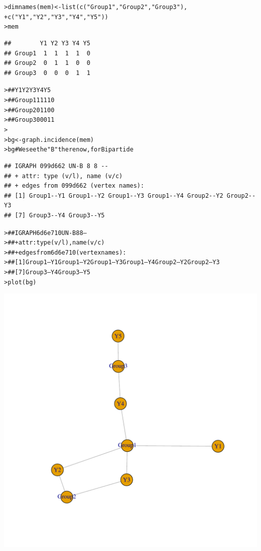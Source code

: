 \documentclass[12pt]{article}\usepackage[]{graphicx}\usepackage[]{color}
\makeatletter
\newcommand{\hlstr}[1]{\textcolor[rgb]{0.82,0.78,0.62}{#1}}%
\newcommand{\hlcom}[1]{\textcolor[rgb]{0.404,0.408,0.42}{#1}}%
\newcommand{\hlstd}[1]{\textcolor[rgb]{0.882,0.878,0.898}{#1}}%
\newcommand{\hlkwb}[1]{\textcolor[rgb]{0.902,0.675,0.196}{#1}}%
\newcommand{\hlkwd}[1]{\textcolor[rgb]{0.733,0.388,0.812}{#1}}%
\newenvironment{kframe}{%
 \def\at@end@of@kframe{}%
 \ifinner\ifhmode%
  \def\at@end@of@kframe{\end{minipage}}%
  \begin{minipage}{\columnwidth}%
 \fi\fi%
 \def\FrameCommand##1{\hskip\@totalleftmargin \hskip-\fboxsep
 \colorbox{shadecolor}{##1}\hskip-\fboxsep
     \hskip-\linewidth \hskip-\@totalleftmargin \hskip\columnwidth}%
 \MakeFramed {\advance\hsize-\width
   \@totalleftmargin\z@ \linewidth\hsize
   \@setminipage}}%
 {\par\unskip\endMakeFramed%
 \at@end@of@kframe}
\newenvironment{knitrout}{}{} %
\makeatother
\begin{document}
\begin{flushleft}
\begin{center}
\begin{knitrout}
\begin{kframe}
\begin{alltt}
\hlstd{> }\hlkwd{dimnames}\hlstd{(mem)} \hlkwb{<-} \hlkwd{list}\hlstd{(}\hlkwd{c}\hlstd{(}\hlstr{"Group1"}\hlstd{,}\hlstr{"Group2"}\hlstd{,}\hlstr{"Group3"}\hlstd{),}
\hlstd{+ }                      \hlkwd{c}\hlstd{(}\hlstr{"Y1"}\hlstd{,}\hlstr{"Y2"}\hlstd{,}\hlstr{"Y3"}\hlstd{,}\hlstr{"Y4"}\hlstd{,}\hlstr{"Y5"}\hlstd{))}
\hlstd{> }\hlstd{mem}
\end{alltt}
\begin{verbatim}
##        Y1 Y2 Y3 Y4 Y5
## Group1  1  1  1  1  0
## Group2  0  1  1  0  0
## Group3  0  0  0  1  1
\end{verbatim}
\begin{alltt}
\hlstd{> }\hlcom{##        Y1 Y2 Y3 Y4 Y5}
\hlstd{> }\hlcom{## Group1  1  1  1  1  0}
\hlstd{> }\hlcom{## Group2  0  1  1  0  0}
\hlstd{> }\hlcom{## Group3  0  0  0  1  1}
\hlstd{> }
\hlstd{> }\hlstd{bg} \hlkwb{<-} \hlkwd{graph.incidence}\hlstd{(mem)}
\hlstd{> }\hlstd{bg}  \hlcom{# We see the "B" there now, for Bipartide}
\end{alltt}
\begin{verbatim}
## IGRAPH 099d662 UN-B 8 8 -- 
## + attr: type (v/l), name (v/c)
## + edges from 099d662 (vertex names):
## [1] Group1--Y1 Group1--Y2 Group1--Y3 Group1--Y4 Group2--Y2 Group2--Y3
## [7] Group3--Y4 Group3--Y5
\end{verbatim}
\begin{alltt}
\hlstd{> }\hlcom{## IGRAPH 6d6e710 UN-B 8 8 --}
\hlstd{> }\hlcom{## + attr: type (v/l), name (v/c)}
\hlstd{> }\hlcom{## + edges from 6d6e710 (vertex names):}
\hlstd{> }\hlcom{## [1] Group1--Y1 Group1--Y2 Group1--Y3 Group1--Y4 Group2--Y2 Group2--Y3}
\hlstd{> }\hlcom{## [7] Group3--Y4 Group3--Y5}
\hlstd{> }\hlkwd{plot}\hlstd{(bg)}
\end{alltt}
\end{kframe}
\includegraphics[width=6in]{figure/Network_Basics-5} 

\end{knitrout}
\end{center}
\end{flushleft}
\end{document}
